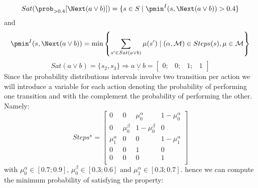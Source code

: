 \[
	Sat(\prob_{>0.4}[\Next(a \vee b)]) = \{s \in S \mid \pmin^I(s, \Next(a \vee b)) > 0.4 \}
\]
and
\[
	\pmin^I(s, \Next(a \vee b)) = \min \left\{ \sum_{s' \in Sat(a \vee b)} \mu(s') \mid (\alpha, \mathcal{M}) \in Steps(s), \mu \in \mathcal{M} \right\}
\]
\[
	Sat(a \vee b) = \{ s_2, s_3 \} \Rightarrow \underline{a \vee b} = \begin{bmatrix} 0; & 0; & 1; & 1 \end{bmatrix}
\]
Since the probability distributions intervals involve two transition per action
we will introduce a variable for each action denoting the probability of
performing one transition and with the complement the probability of performing
the other.
Namely:
\[
	Steps^\star =
	\begin{bmatrix}
		0            & 0           & \mu_0^\alpha  & 1-\mu_0^\alpha \\
		0            & \mu_0^\beta & 1-\mu_0^\beta & 0              \\
		\hline
		\mu_1^\alpha & 0           & 0             & 1-\mu_1^\alpha \\
		\hline
		0            & 0           & 1             & 0              \\
		\hline
		0            & 0           & 0             & 1              \\
	\end{bmatrix}
\]
with $\mu_0^\alpha \in [0.7;0.9]$, $\mu_0^\beta \in [0.3;0.6]$ and
$\mu_1^\alpha \in [0.3; 0.7]$.
hence we can compute the minimum probability of satisfying the property:
